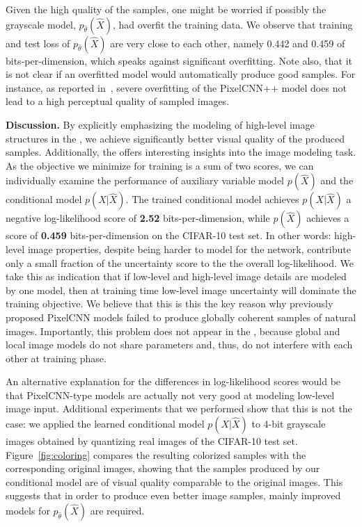 Given the high quality of the samples, one might be worried if possibly 
the grayscale model, $p_{\hat\theta}(\widehat X)$, had overfit the training data. 
We observe that training and test loss of $p_{\hat\theta}(\widehat{X})$ are 
very close to each other, namely 0.442 and 0.459 of bits-per-dimension, 
which speaks against significant overfitting. 
Note also, that it is not clear if an overfitted model would automatically produce good
samples.
For instance, as reported in~\cite{salimans2016pixel}, severe overfitting of the PixelCNN++
model does not lead to a high perceptual quality of sampled images.


\textbf{Discussion.} By explicitly emphasizing the modeling of high-level 
image structures in the \GRAY, we achieve significantly better visual 
quality of the produced samples.
Additionally, the \GRAY offers interesting insights into the image modeling task. 
As the objective we minimize for training is a sum of two scores, we can individually examine 
the performance of auxiliary variable model $p(\widehat{X})$ and the conditional model $p(X|\widehat{X})$.
The trained conditional model achieves $p(X|\widehat{X})$ a negative log-likelihood score of \textbf{2.52} 
bits-per-dimension, while $p(\widehat{X})$ achieves a score of \textbf{0.459} bits-per-dimension on the 
CIFAR-10 test set. In other words: high-level image properties, despite being harder to model for the 
network, contribute only a small fraction of the uncertainty score to the the overall log-likelihood. 
We take this as indication that if low-level and high-level image details are modeled by one 
model, then at training time low-level image uncertainty will dominate the training objective.
We believe that this is this the key reason why previously proposed PixelCNN models failed
to produce globally coherent samples of natural images.
Importantly, this problem does not appear in the \GRAY, because global and local image models
do not share parameters and, thus, do not interfere with each other at training phase.

An alternative explanation for the differences in log-likelihood scores would be 
that PixelCNN-type models are actually not very good at modeling low-level image input. 
Additional experiments that we performed show that this is not the case: 
we applied the learned conditional model $p(X|\widehat{X})$ to 4-bit grayscale images
obtained by quantizing real images of the CIFAR-10 test set. Figure~\ref{fig:coloring} 
compares the resulting colorized samples with the corresponding original images,
showing that the samples produced by our conditional model are of visual quality comparable
to the original images.
This suggests that in order to produce even better image samples, 
mainly improved models for $p_{\hat\theta}(\widehat{X})$ are required. 

